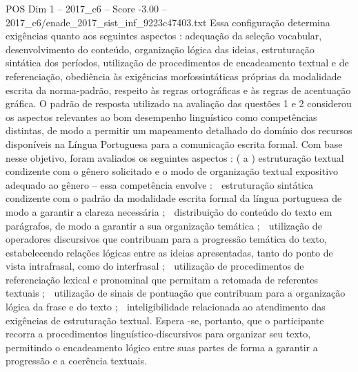 \begin{textsample}{POS Dim 1 – 2017\_c6 – Score -3.00 – 2017\_c6/enade\_2017\_sist\_inf\_9223c47403.txt}
Essa configuração determina exigências quanto aos seguintes aspectos : adequação da seleção vocabular, desenvolvimento do conteúdo, organização lógica das ideias, estruturação sintática dos períodos, utilização de procedimentos de encadeamento textual e de referenciação, obediência às exigências morfossintáticas próprias da modalidade escrita da norma-padrão, respeito às regras ortográficas e às regras de acentuação gráfica.
O padrão de resposta utilizado na avaliação das questões 1 e 2 considerou os aspectos relevantes ao bom desempenho linguístico como competências distintas, de modo a permitir um mapeamento detalhado do domínio dos recursos disponíveis na Língua Portuguesa para a comunicação escrita formal.
Com base nesse objetivo, foram avaliados os seguintes aspectos : ( a ) estruturação textual condizente com o gênero solicitado e o modo de organização textual expositivo adequado ao gênero – essa competência envolve :  estruturação sintática condizente com o padrão da modalidade escrita formal da língua portuguesa de modo a garantir a clareza necessária ;  distribuição do conteúdo do texto em parágrafos, de modo a garantir a sua organização temática ;  utilização de operadores discursivos que contribuam para a progressão temática do texto, estabelecendo relações lógicas entre as ideias apresentadas, tanto do ponto de vista intrafrasal, como do interfrasal ;  utilização de procedimentos de referenciação lexical e pronominal que permitam a retomada de referentes textuais ;  utilização de sinais de pontuação que contribuam para a organização lógica da frase e do texto ;  inteligibilidade relacionada ao atendimento das exigências de estruturação textual.
Espera -se, portanto, que o participante recorra a procedimentos linguístico-discursivos para organizar seu texto, permitindo o encadeamento lógico entre suas partes de forma a garantir a progressão e a coerência textuais.

\end{textsample}
